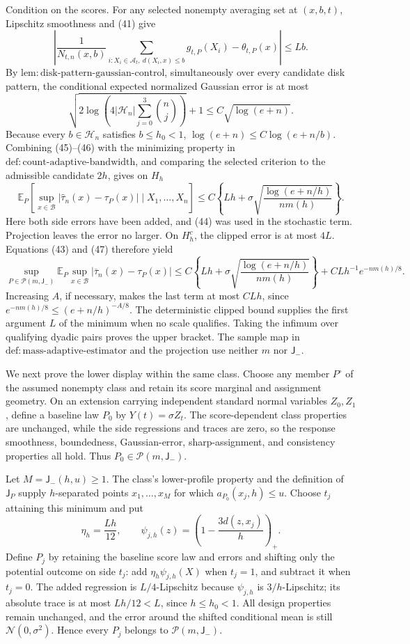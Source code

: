 Condition on the scores. For any selected nonempty averaging set at \((x,b,t)\), Lipschitz smoothness and (41) give
\[
 \left|\frac1{N_{t,n}(x,b)}\sum_{i:X_i\in\mathcal A_t,\ d(X_i,x)\le b}g_{t,P}(X_i)-\theta_{t,P}(x)\right|\le Lb. \tag{45}
\]
By \(\mathrm{lem:disk\text{-}pattern\text{-}gaussian\text{-}control}\), simultaneously over every candidate disk pattern, the conditional expected normalized Gaussian error is at most
\[
 \sqrt{2\log\!\left(4|\mathcal H_n|\sum_{j=0}^3\binom nj\right)}+1\le C\sqrt{\log(e+n)}. \tag{46}
\]
Because every \(b\in\mathcal H_n\) satisfies \(b\le h_0<1\), \(\log(e+n)\le C\log(e+n/b)\). Combining (45)--(46) with the minimizing property in \(\mathrm{def:count\text{-}adaptive\text{-}bandwidth}\), and comparing the selected criterion to the admissible candidate \(2h\), gives on \(H_h\)
\[
 \mathbb E_P\!\left[\sup_{x\in\mathcal B}|\widehat\tau_n(x)-\tau_P(x)|\mid X_1,\ldots,X_n\right]
 \le C\left\{Lh+\sigma\sqrt{\frac{\log(e+n/h)}{nm(h)}}\right\}. \tag{47}
\]
Here both side errors have been added, and (44) was used in the stochastic term. Projection leaves the error no larger. On \(H_h^c\), the clipped error is at most \(4L\). Equations (43) and (47) therefore yield
\[
 \sup_{P\in\mathcal P(m,\mathsf J_{-})}
 \mathbb E_P\sup_{x\in\mathcal B}|\overline\tau_n(x)-\tau_P(x)|
 \le C\left\{Lh+\sigma\sqrt{\frac{\log(e+n/h)}{nm(h)}}\right\}
   +CLh^{-1}e^{-nm(h)/8}. \tag{48}
\]
Increasing \(A\), if necessary, makes the last term at most \(CLh\), since \(e^{-nm(h)/8}\le(e+n/h)^{-A/8}\). The deterministic clipped bound supplies the first argument \(L\) of the minimum when no scale qualifies. Taking the infimum over qualifying dyadic pairs proves the upper bracket. The sample map in \(\mathrm{def:mass\text{-}adaptive\text{-}estimator}\) and the projection use neither \(m\) nor \(\mathsf J_{-}\).

We next prove the lower display within the same class. Choose any member \(P^\circ\) of the assumed nonempty class and retain its score marginal and assignment geometry. On an extension carrying independent standard normal variables \(Z_0,Z_1\), define a baseline law \(P_0\) by \(Y(t)=\sigma Z_t\). The score-dependent class properties are unchanged, while the side regressions and traces are zero, so the response smoothness, boundedness, Gaussian-error, sharp-assignment, and consistency properties all hold. Thus \(P_0\in\mathcal P(m,\mathsf J_{-})\).

Let \(M=\mathsf J_{-}(h,u)\ge1\). The class's lower-profile property and the definition of \(\mathsf J_P\) supply \(h\)-separated points \(x_1,\ldots,x_M\) for which \(a_{P_0}(x_j,h)\le u\). Choose \(t_j\) attaining this minimum and put
\[
 \eta_h=\frac{Lh}{12},\qquad
 \psi_{j,h}(z)=\left(1-\frac{3d(z,x_j)}h\right)_+.
\]
Define \(P_j\) by retaining the baseline score law and errors and shifting only the potential outcome on side \(t_j\): add \(\eta_h\psi_{j,h}(X)\) when \(t_j=1\), and subtract it when \(t_j=0\). The added regression is \(L/4\)-Lipschitz because \(\psi_{j,h}\) is \(3/h\)-Lipschitz; its absolute trace is at most \(Lh/12<L\), since \(h\le h_0<1\). All design properties remain unchanged, and the error around the shifted conditional mean is still \(\mathcal N(0,\sigma^2)\). Hence every \(P_j\) belongs to \(\mathcal P(m,\mathsf J_{-})\).

